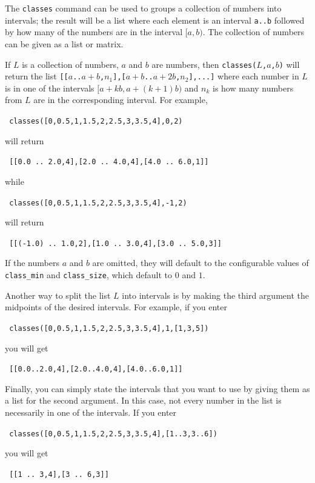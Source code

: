 \documentclass[a4paper,11pt]{book}
\begin{document}
The \texttt{classes} command can be used to groups a collection of
numbers into intervals; the result will be a list where each element
is an interval \texttt{a..b} followed by how many of the numbers are
in the interval $[a,b)$. The collection of numbers can be given as a
list or matrix.

If $L$ is a collection of numbers, $a$ and $b$ are numbers, then
\texttt{classes($L$,$a$,$b$)} will return the list
\texttt{[[$a$..$a+b$,$n_1$],[$a+b$..$a+2b$,$n_2$],...]} where each number in $L$ is
in one of the intervals $[a+kb, a+(k+1)b)$ and $n_k$ is
how many numbers from $L$ are in the corresponding interval.  For
example,
\begin{center}
  \tt
  classes([0,0.5,1,1.5,2,2.5,3,3.5,4],0,2)
\end{center}
will return
\begin{center}
  \tt
  [[0.0 .. 2.0,4],[2.0 .. 4.0,4],[4.0 .. 6.0,1]]
\end{center}
while 
\begin{center}
  \tt
  classes([0,0.5,1,1.5,2,2.5,3,3.5,4],-1,2)
\end{center}
will return
\begin{center}
  \tt
  [[(-1.0) .. 1.0,2],[1.0 .. 3.0,4],[3.0 .. 5.0,3]]
\end{center}
If the numbers $a$ and $b$ are omitted, they will default to the
configurable values of \texttt{class\_min} and \texttt{class\_size},
which default to $0$ and  $1$.

Another way to split the list $L$ into intervals is by making the
third argument the midpoints of the desired intervals.  For example,
if you enter
\begin{center}
  \tt
  classes([0,0.5,1,1.5,2,2.5,3,3.5,4],1,[1,3,5])
\end{center}
you will get
\begin{center}
  \tt
  [[0.0..2.0,4],[2.0..4.0,4],[4.0..6.0,1]]
\end{center}

Finally, you can simply state the intervals that you want to use by
giving them as a list for the second argument.  In this case, not
every number in the list is necessarily in one of the intervals.  If
you enter
\begin{center}
  \tt
  classes([0,0.5,1,1.5,2,2.5,3,3.5,4],[1..3,3..6])
\end{center}
you will get
\begin{center}
  \tt
  [[1 .. 3,4],[3 .. 6,3]]
\end{center}
\end{document}
